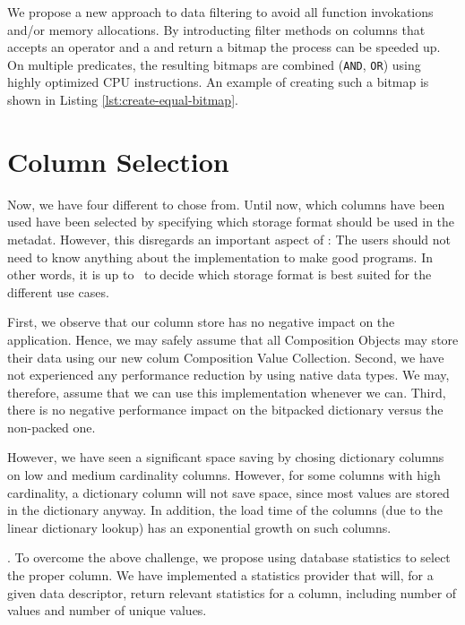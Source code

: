 We propose a new approach to data filtering to avoid all function invokations and/or memory allocations. By introducting filter methods on columns that accepts an operator and a  and return a bitmap the process can be speeded up. On multiple predicates, the resulting bitmaps are combined (\texttt{AND}, \texttt{OR}) using highly optimized CPU instructions. An example of creating such a bitmap is shown in Listing \ref{lst:create-equal-bitmap}.



\section{Column Selection}
\label{sec:Column Selection}
Now, we have four different  to chose from. Until now, which columns have been used have been selected by specifying which storage format should be used in the metadat. However, this disregards an important aspect of \mdd: The users should not need to know anything about the implementation to make good programs. In other words, it is up to \gap~to decide which storage format is best suited for the different use cases.

First, we observe that our column store has no negative impact on the application. Hence, we may safely assume that all Composition Objects may store their data using our new colum Composition Value Collection. Second, we have not experienced any performance reduction by using native data types. We may, therefore, assume that we can use this implementation whenever we can. Third, there is no negative performance impact on the bitpacked dictionary versus the non-packed one.

However, we have seen a significant space saving by chosing dictionary columns on low and medium cardinality columns. However, for some columns with high cardinality, a dictionary column will not save space, since most values are stored in the dictionary anyway. In addition, the load time of the columns (due to the linear dictionary lookup) has an exponential growth on such columns.

.
To overcome the above challenge, we propose using database statistics to select the proper column. We have implemented a statistics provider that will, for a given data descriptor, return relevant statistics for a column, including number of values and number of unique values.

